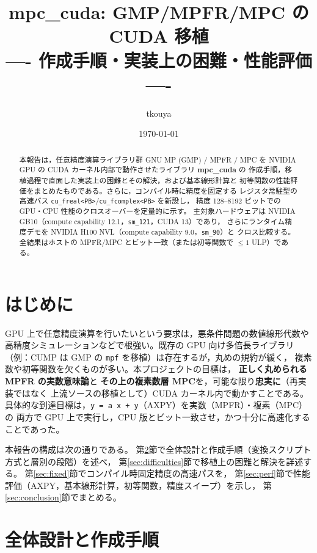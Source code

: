 \documentclass[uplatex,dvipdfmx,a4paper,11pt]{jsarticle}
\title{mpc\_cuda: GMP/MPFR/MPC の CUDA 移植\\
{\large ---- 作成手順・実装上の困難・性能評価 ----}}
\author{tkouya}
\date{\today}
\newcommand{\code}[1]{\texttt{#1}}
\begin{document}
\maketitle

\begin{abstract}
本報告は，任意精度演算ライブラリ群 GNU MP (GMP) / MPFR / MPC を
NVIDIA GPU の CUDA カーネル内部で動作させたライブラリ \textbf{mpc\_cuda} の
作成手順，移植過程で直面した実装上の困難とその解決，および基本線形計算と
初等関数の性能評価をまとめたものである。さらに，コンパイル時に精度を固定する
レジスタ常駐型の高速パス \code{cu\_freal<PB>}/\code{cu\_fcomplex<PB>} を新設し，
精度 128--8192 ビットでの GPU・CPU 性能のクロスオーバーを定量的に示す。
主対象ハードウェアは NVIDIA GB10（compute capability 12.1，\code{sm\_121}，CUDA 13）であり，
さらにランタイム精度デモを NVIDIA H100 NVL（compute capability 9.0，\code{sm\_90}）と
クロス比較する。全結果はホストの MPFR/MPC とビット一致（または初等関数で $\le 1$ ULP）である。
\end{abstract}

\tableofcontents
\bigskip

\section{はじめに}
\label{sec:intro}

GPU 上で任意精度演算を行いたいという要求は，悪条件問題の数値線形代数や
高精度シミュレーションなどで根強い。既存の GPU 向け多倍長ライブラリ
（例：CUMP は GMP の \code{mpf} を移植）は存在するが，丸めの規約が緩く，
複素数や初等関数を欠くものが多い。本プロジェクトの目標は，
\textbf{正しく丸められる MPFR の実数意味論}と
\textbf{その上の複素数層 MPC}を，可能な限り\textbf{忠実に}（再実装ではなく
上流ソースの移植として）CUDA カーネル内で動かすことである。
具体的な到達目標は，\code{y = a\,x + y}（AXPY）を実数（MPFR）・複素（MPC）の
両方で GPU 上で実行し，CPU 版とビット一致させ，かつ十分に高速化することであった。

本報告の構成は次の通りである。
第\ref{sec:procedure}節で全体設計と作成手順（変換スクリプト方式と層別の段階）を述べ，
第\ref{sec:difficulties}節で移植上の困難と解決を詳述する。
第\ref{sec:fixed}節でコンパイル時固定精度の高速パスを，
第\ref{sec:perf}節で性能評価（AXPY，基本線形計算，初等関数，精度スイープ）を示し，
第\ref{sec:conclusion}節でまとめる。

\section{全体設計と作成手順}
\label{sec:procedure}
\end{document}
